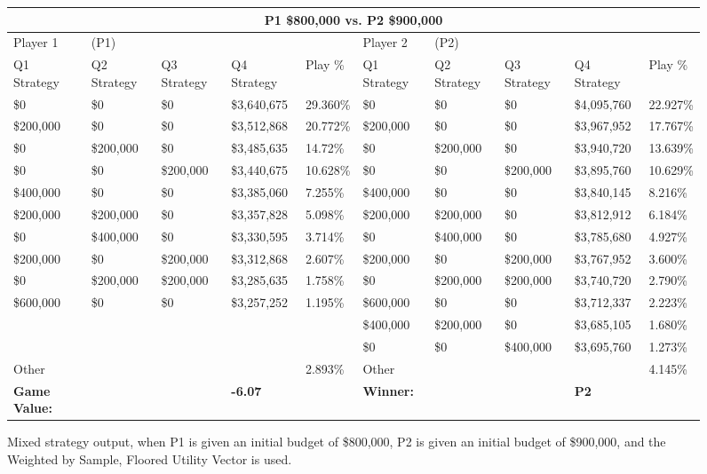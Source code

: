 \documentclass[11pt]{article}
\begin{document}
\begin{figure}
\tiny
\begin{tabular}{ |p{1.0cm}p{1.0cm}p{1.0cm}p{2.0cm}|p{1.0cm}||p{1.0cm}p{1.0cm}p{1.0cm}p{2.0cm}|p{1.0cm}|}
\hline
\multicolumn{10}{|c|}{P1 \$800,000 vs. P2 \$900,000} \\
\hline
Player 1 & (P1) & & & & Player 2 & (P2) & & & \\
\hline
Q1 Strategy & Q2 Strategy & Q3 Strategy & Q4 Strategy  &  Play \% & Q1 Strategy & Q2 Strategy & Q3 Strategy & Q4 Strategy  &  Play \%\\
\hline
\$0 & \$0 & \$0 & \$3,640,675 & 29.360\% & \$0 & \$0 & \$0 & \$4,095,760 & 22.927\% \\
\$200,000 & \$0 & \$0 & \$3,512,868 & 20.772\% & \$200,000 & \$0 & \$0 & \$3,967,952 & 17.767\% \\
\$0 & \$200,000 & \$0 & \$3,485,635 & 14.72\% & \$0 & \$200,000 & \$0 & \$3,940,720 & 13.639\% \\
\$0 & \$0 & \$200,000 & \$3,440,675 & 10.628\% & \$0 & \$0 & \$200,000 & \$3,895,760 & 10.629\% \\
\$400,000 & \$0 & \$0 & \$3,385,060 & 7.255\% & \$400,000 & \$0 & \$0 & \$3,840,145 & 8.216\% \\
\$200,000 & \$200,000 & \$0 & \$3,357,828 & 5.098\% & \$200,000 & \$200,000 & \$0 & \$3,812,912 & 6.184\% \\
\$0 & \$400,000 & \$0 & \$3,330,595 & 3.714\% & \$0 & \$400,000 & \$0 & \$3,785,680 & 4.927\% \\
\$200,000 & \$0 & \$200,000 & \$3,312,868 & 2.607\% & \$200,000 & \$0 & \$200,000 & \$3,767,952 & 3.600\% \\
\$0 & \$200,000 & \$200,000 & \$3,285,635 & 1.758\% & \$0 & \$200,000 & \$200,000 & \$3,740,720 & 2.790\% \\
\$600,000 & \$0 & \$0 & \$3,257,252 & 1.195\% & \$600,000 & \$0 & \$0 & \$3,712,337 & 2.223\% \\
&&&&&\$400,000 & \$200,000 & \$0 & \$3,685,105 & 1.680\% \\
&&&&&\$0 & \$0 & \$400,000 & \$3,695,760 & 1.273\% \\
\hline
Other &&&& 2.893\% & Other &&&& 4.145\% \\
\hline
\small \textbf{Game Value:} &&& \small \textbf{-6.07} && \small \textbf{Winner:} &&& \small \textbf{P2}&\\
\hline
\end{tabular}
\caption{Mixed strategy output, when P1 is given an initial budget of \$800,000, P2 is given an initial budget of \$900,000, and the Weighted by Sample, Floored Utility Vector is used.}
\label{8v9table.3}
\end{figure}
\end{document}
